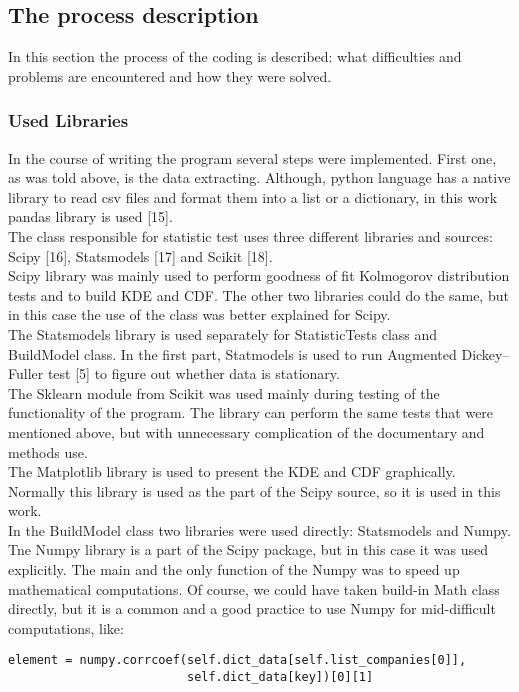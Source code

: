 \documentclass{article}
\begin{document}
\subsection{The process description}
In this section the process of the coding is described: what difficulties and problems are encountered and how they were solved.
\subsubsection{Used Libraries}
In the course of writing the program several steps were implemented. First one, as was told above, is the data extracting. Although, python language has a native library to read csv files and format them into a list or a dictionary, in this work pandas library is used [15]. \\
The class responsible for statistic test uses three different libraries and sources: Scipy [16], Statsmodels [17] and Scikit [18].\\
Scipy library was mainly used to perform goodness of fit Kolmogorov distribution tests and to build KDE and CDF. The other two libraries could do the same, but in this case the use of the class was better explained for Scipy.\\
The Statsmodels library is used separately for StatisticTests class and BuildModel class. In the first part, Statmodels is used to run Augmented Dickey–Fuller test [5] to figure out whether data is stationary.\\
The Sklearn module from Scikit was used mainly during testing of the functionality of the program. The library can perform the same tests that were mentioned above, but with unnecessary complication of the documentary and methods use.\\
The Matplotlib library is used to present the KDE and CDF graphically. Normally this library is used as the part of the Scipy source, so it is used in this work.\\ 
In the BuildModel class two libraries were used directly: Statsmodels and Numpy. Tne Numpy library is a part of the Scipy package, but in this case it was used explicitly. The main and the only function of the Numpy was to speed up mathematical computations. Of course, we could have taken build-in Math class directly, but it is a common and a good practice to use Numpy for mid-difficult computations, like:
\begin{verbatim}
element = numpy.corrcoef(self.dict_data[self.list_companies[0]],
                         self.dict_data[key])[0][1]
\end{verbatim}
\end{document}
